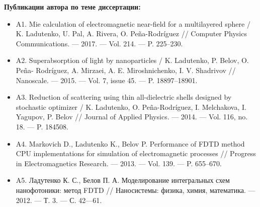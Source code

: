 \documentclass[14pt]{beamer}
\begin{document}
\begin{frame}
  \scriptsize 
  \textbf{Публикации автора по теме диссертации:}
  \begin{itemize}
  \item A1. Mie calculation of electromagnetic near-field for a multilayered sphere / K.
Ladutenko, U. Pal, A. Rivera, O. Peña-Rodríguez // Computer Physics Communications. — 2017. — Vol. 214. — P. 225–230.
\item A2. Superabsorption of light by nanoparticles / K. Ladutenko, P. Belov, O. Peña-
Rodríguez, A. Mirzaei, A. E. Miroshnichenko, I. V. Shadrivov // Nanoscale. —
2015. — Vol. 7, issue 45. — P. 18897–18901.
\item A3. Reduction of scattering using thin all-dielectric shells designed by stochastic
optimizer / K. Ladutenko, O. Peña-Rodríguez, I. Melchakova, I. Yagupov, P.
Belov // Journal of Applied Physics. — 2014. — Vol. 116, no. 18. —
P. 184508.
\item A4. Markovich D., Ladutenko K., Belov P. Performance of FDTD method CPU implementations for simulation of electromagnetic processes // Progress in Electromagnetics Research. — 2013. — Vol. 139. — P. 655–670.
\item A5. Ладутенко К. С., Белов П. А. Моделирование интегральных схем нанофотоники: метод FDTD // Наносистемы: физика, химия, математика. —
2012. — Т. 3. — С. 42—61.
  \end{itemize}
\end{frame}
\end{document}
